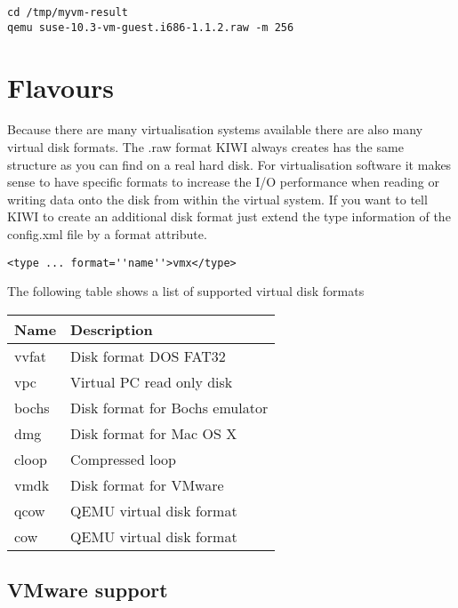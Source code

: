 \begin{Command}{12cm}
\begin{verbatim}
cd /tmp/myvm-result
qemu suse-10.3-vm-guest.i686-1.1.2.raw -m 256
\end{verbatim}
\end{Command}

\section{Flavours}

Because there are many virtualisation systems available there are also
many virtual disk formats. The .raw format KIWI always creates has the
same structure as you can find on a real hard disk. For virtualisation
software it makes sense to have specific formats to increase the
I/O performance when reading or writing data onto the disk from within
the virtual system. If you want to tell KIWI to create an additional
disk format just extend the type information of the config.xml file
by a format attribute.

\begin{Command}{12cm}
\begin{verbatim}
<type ... format=''name''>vmx</type>
\end{verbatim}
\end{Command}

The following table shows a list of supported virtual disk formats

\begin{tabular}[h]{|p{4cm}|p{6cm}|}
\hline
\textbf{Name} & \textbf{Description} \\
\hline
vvfat       & Disk format DOS FAT32 \\
vpc         & Virtual PC read only disk  \\
bochs       & Disk format for Bochs emulator  \\
dmg         & Disk format for Mac OS X \\
cloop       & Compressed loop \\
vmdk        & Disk format for VMware \\
qcow        & QEMU virtual disk format  \\
cow         & QEMU virtual disk format  \\
\hline
\end{tabular}

\subsection{VMware support}

